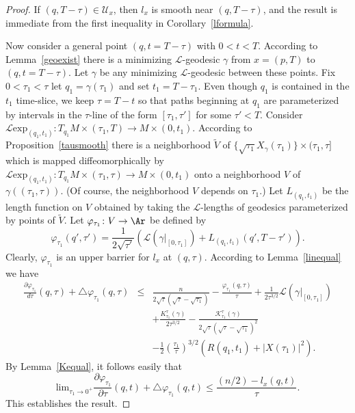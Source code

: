 \begin{proof}
If $(q,T-\tau)\in {\mathcal U}_{x}$, then $l_x$ is smooth near $(q,T-\tau)$,
and the result is immediate from the first inequality in
Corollary~\ref{lformula}.


Now consider a general point $(q,t=T-\tau)$ with $0<t<T$. According to
Lemma~\ref{geoexist} there is  a minimizing ${\mathcal L}$-geodesic $\gamma$
from $x=(p,T)$ to $(q,t=T-\tau)$. Let $\gamma$ be any minimizing ${\mathcal
L}$-geodesic between these points. Fix $0<\tau_1<\tau$ let $q_1=\gamma(\tau_1)$
and set $t_1=T-\tau_1$. Even though $q_1$ is contained in the $t_1$ time-slice,
we keep $\tau=T-t$ so that paths beginning at $q_1$ are parameterized by
intervals in the $\tau$-line of the form $[\tau_1,\tau']$ for some $\tau'<T$.
Consider ${\mathcal L}\mathrm{exp}_{(q_1,t_1)}\colon T_{q_1}M\times (\tau_1,T)\to
M\times (0,t_1)$. According to Proposition~\ref{tausmooth} there is a
neighborhood $\widetilde V$ of $\{\sqrt{\tau_1}X_\gamma(\tau_1)\}\times
(\tau_1,\tau]$ which is mapped diffeomorphically  by ${\mathcal L}\mathrm{exp}_{(q_1,t_1)}\colon T_{q_1}M\times (\tau_1,\tau)\to M\times (0,t_1)$ onto a
neighborhood $V$ of $\gamma((\tau_1,\tau))$. (Of course, the neighborhood $V$
depends on $\tau_1$.) Let $L_{(q_1,t_1)}$ be the length function on $V$
obtained by taking the ${\mathcal L}$-lengths of geodesics parameterized by
points of $\widetilde V$. Let $\varphi_{\tau_1}\colon V\to \Ar$ be defined by
$$\varphi_{\tau_1}(q',\tau')=\frac{1}{2\sqrt{\tau'}}\left({\mathcal
L}(\gamma|_{[0,\tau_1]})+L_{(q_1,t_1)}(q',T-\tau')\right).$$
Clearly, $\varphi_{\tau_1}$ is an upper barrier for $l_x$ at
$(q,\tau)$. According to Lemma~\ref{linequal} we have
\begin{eqnarray*}
\frac{\partial \varphi_{\tau_1}}{d\tau}(q,\tau)+\triangle
\varphi_{\tau_1}(q,\tau) & \le &
\frac{n}{2\sqrt{\tau}(\sqrt{\tau}-\sqrt{\tau_1})}-\frac{\varphi_{\tau_1}(q,\tau)}{\tau}
+\frac{1}{2\tau^{3/2}}{\mathcal L}(\gamma|_{[0,\tau_1]})\\
& & +\frac{K^{\tau}_{\tau_1}(\gamma)}{2\tau^{3/2}}-\frac{{\mathcal
K}_{\tau_1}^{\tau}(\gamma)}{2\sqrt{\tau}(\sqrt{\tau}-\sqrt{\tau_1})^{2}}
\\ & & -\frac{1}{2}\left(\frac{\tau_1}{\tau}\right)^{3/2}\left(R(q_1,t_1)+|X(\tau_1)|^2\right).
\end{eqnarray*}
By Lemma~\ref{Kequal},  it follows easily that
$$\mathrm{lim}_{\tau_1\rightarrow 0^+}
\frac{\partial \varphi_{\tau_1}}{\partial \tau}(q,t)+\triangle
\varphi_{\tau_1}(q,t)\le \frac{(n/2)-l_x(q,t)}{\tau}.$$ This
establishes the result.
\end{proof}

